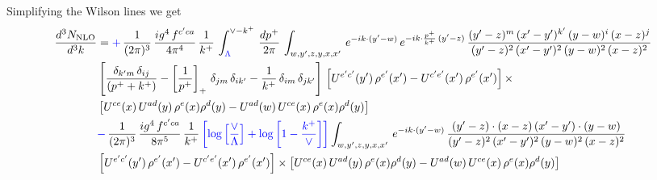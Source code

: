 \documentclass[9pt]{article}
\numberwithin{equation}{section}
\begin{document}
Simplifying the Wilson lines we get 
\begin{align}
    \frac{d^{3}N_{\rm NLO}}{d^{3}k} & = {\color{blue}+}\,\frac{1}{(2\pi)^{3}}\, \frac{ig^{4}\,f^{c'ca}}{4\pi^{4}}\, \frac{1}{k^{+}}\,\int_{{\color{blue}\Lambda}}^{\vee-k^{+}}\, \frac{dp^{+}}{2\pi}\, \int_{w,y',z,y,x,x'}\, e^{-ik\cdot (y'-w)}\, e^{-ik\cdot \frac{p^{+}}{k^{+}}\,(y'-z)}\,\frac{(y'-z)^{m}\,(x'-y')^{k'}\,(y-w)^{i}\,(x-z)^{j}}{(y'-z)^{2}\,(x'-y')^{2}\,(y-w)^{2}\,(x-z)^{2}}\notag \\ & \left[\frac{\delta_{k'm}\,\delta_{ij}}{(p^{+}+k^{+})}-\left[\frac{1}{p^{+}}\right]_{+}\,\delta_{jm}\,\delta_{ik'}-\frac{1}{k^{+}}\, \delta_{im}\, \delta_{jk'}\right]\, \left[U^{e'c'}(y')\,\rho^{e'}(x')-U^{c'e'}(x')\,\rho^{e'}(x')\right]\times \notag \\ &  \left[U^{ce}(x)\,U^{ad}(y)\,\rho^{e}(x)\rho^{d}(y)-U^{ad}(w)\,U^{ce}(x)\,\rho^{e}(x)\rho^{d}(y)\right]\notag \\ & {\color{blue}-}\,\frac{1}{(2\pi)^{3}}\, \frac{ig^{4}\,f^{c'ca}}{8\pi^{5}}\, \frac{1}{k^{+}}\,{\color{blue}\left[\log{\left[\frac{\vee}{\Lambda}\right]} + \log{\left[1-\frac{k^{+}}{\vee}\right]}\right]} \int_{w,y',z,y,x,x'}\, e^{-ik\cdot (y'-w)}\,\frac{(y'-z)\cdot (x-z)\,(x'-y')\cdot (y-w)}{(y'-z)^{2}\,(x'-y')^{2}\,(y-w)^{2}\,(x-z)^{2}}\notag \\ & \left[U^{e'c'}(y')\,\rho^{e'}(x')-U^{c'e'}(x')\,\rho^{e'}(x')\right]\times  \left[U^{ce}(x)\,U^{ad}(y)\,\rho^{e}(x)\rho^{d}(y)-U^{ad}(w)\,U^{ce}(x)\,\rho^{e}(x)\rho^{d}(y)\right]
\end{align}
\end{document}
